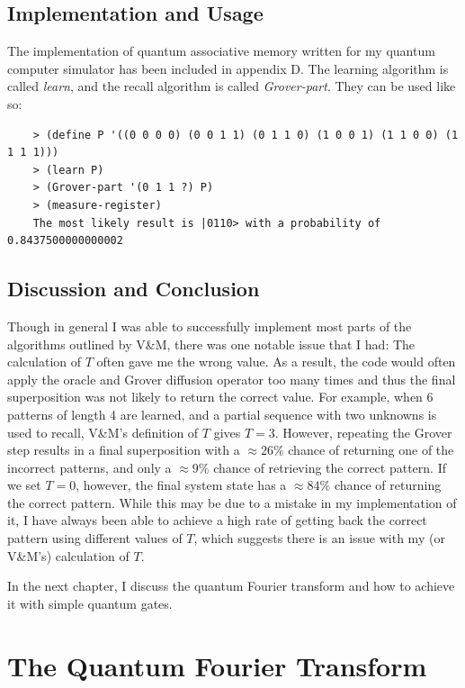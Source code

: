 \documentclass[11pt]{report}
\newcommand{\?}{\stackrel{?}{=}}
\begin{document}
\section{Implementation and Usage}
The implementation of quantum associative memory written for my quantum computer simulator has been included in appendix D. The learning algorithm is called \textit{learn}, and the recall algorithm is called \textit{Grover-part}. They can be used like so:
	
	\begin{lstlisting}
	> (define P '((0 0 0 0) (0 0 1 1) (0 1 1 0) (1 0 0 1) (1 1 0 0) (1 1 1 1)))
	> (learn P)
	> (Grover-part '(0 1 1 ?) P)
	> (measure-register)
	The most likely result is |0110> with a probability of 0.8437500000000002
	\end{lstlisting}

\section{Discussion and Conclusion}

Though in general I was able to successfully implement most parts of the algorithms outlined by V\&M, there was one notable issue that I had: The calculation of $T$ often gave me the wrong value. As a result, the code would often apply the oracle and Grover diffusion operator too many times and thus the final superposition was not likely to return the correct value. For example, when 6 patterns of length 4 are learned, and a partial sequence with two unknowns is used to recall, V\&M's definition of $T$ gives $T=3$. However, repeating the Grover step results in a final superposition with a $\approx 26\%$ chance of returning one of the incorrect patterns, and only a $\approx 9\%$ chance of retrieving the correct pattern. If we set $T=0$, however, the final system state has a $\approx84\%$ chance of returning the correct pattern. While this may be due to a mistake in my implementation of it, I have always been able to achieve a high rate of getting back the correct pattern using different values of $T$, which suggests there is an issue with my (or V\&M's) calculation of $T$.

In the next chapter, I discuss the quantum Fourier transform and how to achieve it with simple quantum gates.

\chapter{The Quantum Fourier Transform}
\end{document}
